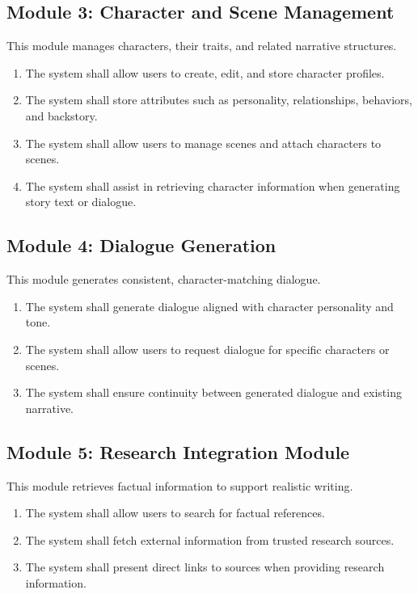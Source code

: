 \subsection{Module 3: Character and Scene Management}
This module manages characters, their traits, and related narrative structures.
\begin{enumerate}
    \item The system shall allow users to create, edit, and store character profiles.
    \item The system shall store attributes such as personality, relationships, behaviors, and backstory.
    \item The system shall allow users to manage scenes and attach characters to scenes.
    \item The system shall assist in retrieving character information when generating story text or dialogue.
\end{enumerate}

\subsection{Module 4: Dialogue Generation}
This module generates consistent, character-matching dialogue.
\begin{enumerate}
    \item The system shall generate dialogue aligned with character personality and tone.
    \item The system shall allow users to request dialogue for specific characters or scenes.
    \item The system shall ensure continuity between generated dialogue and existing narrative.
\end{enumerate}

\subsection{Module 5: Research Integration Module}
This module retrieves factual information to support realistic writing.
\begin{enumerate}
    \item The system shall allow users to search for factual references.
    \item The system shall fetch external information from trusted research sources.
    \item The system shall present direct links to sources when providing research information.
\end{enumerate}

